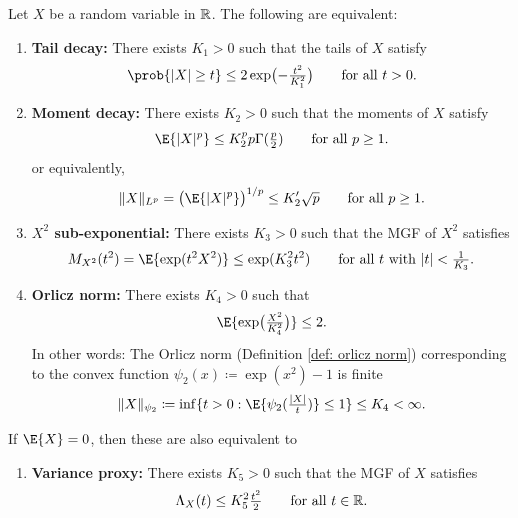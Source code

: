 \begin{mdframed}[innertopmargin=0pt]
\begin{theorem}
    \label{thm: subgaussian equivalences}
    Let \(X\) be a random variable in \(\mathbb{R}\). The following are equivalent:
    \begin{enumerate}[label=(\roman*), noitemsep]
        \item\label{it: subgaussian tail decay}
        \textbf{Tail decay:} There exists \(K_1 > 0\) such that the tails of \(X\) satisfy
        \[
            \prob{\abs{X} \ge t} \le 2 \exp\bigl(-\tfrac{t^2}{K_1^2}\bigr)
            \qquad\text{for all } t > 0.
        \]
        \item\label{it: subgaussian moment decay}
        \textbf{Moment decay:} There exists \(K_2 > 0\) such that the moments of \(X\) satisfy
        \[
            \E{\abs{X}^p} \le K_2^p p \Gamma(\tfrac{p}2)
            \qquad\text{for all } p\ge 1.
        \]
        or equivalently,
        \[
            \norm{X}_{L^p} = \bigl(\E{\abs{X}^p}\bigr)^{1/p} \le K_2' \sqrt{p}
            \qquad\text{for all } p\ge 1.
        \]
        \item\label{it: subgaussian X^2 sub-exponential}
        \textbf{\(X^2\) sub-exponential:} There exists \(K_3 >0\) such that the MGF of \(X^2\) satisfies
        \[
            \MGF_{X^2}(t^2) = \E{\exp(t^2 X^2)} \le \exp(K_3^2 t^2)
            \qquad\text{for all } t \text{ with } \abs{t} < \tfrac1{K_3}.
        \]
        \item\label{it: subgaussian orlicz norm}
        \textbf{Orlicz norm:} There exists \(K_4 > 0\) such that
        \[
            \E{\exp\bigl(\tfrac{X^2}{K_4^2}\bigr)} \le 2.
        \]
        In other words: The Orlicz norm (Definition \ref{def: orlicz norm})
        corresponding to the convex function \(\psi_2(x) \coloneq \exp(x^2) - 1\) is finite
        \[
            \norm{X}_{\psi_2} \coloneq \inf\set{t > 0 :
            \E{\psi_2(\tfrac{\abs{X}}t)} \le 1}
            \le K_4 < \infty.
        \]
    \end{enumerate}
    If \(\E{X} = 0\), then these are also equivalent to
    \begin{enumerate}[label=(\roman*), resume, noitemsep]
        \item\label{it: subgaussian variance proxy}
        \textbf{Variance proxy:} There exists \(K_5 > 0\) such that the MGF of \(X\) satisfies
        \[
            \Lambda_X(t) \le K_5^2 \tfrac{t^2}2
            \qquad\text{for all } t\in \mathbb{R}.
        \]

\end{enumerate}
\end{theorem}
\end{mdframed}
